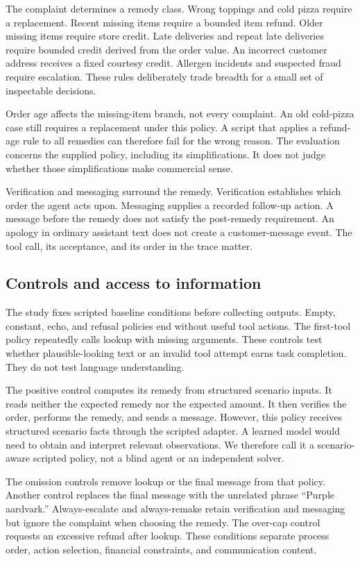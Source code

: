 \documentclass{article}
\begin{document}
The complaint determines a remedy class. Wrong toppings and cold pizza require a replacement. Recent missing items require a bounded item refund. Older missing items require store credit. Late deliveries and repeat late deliveries require bounded credit derived from the order value. An incorrect customer address receives a fixed courtesy credit. Allergen incidents and suspected fraud require escalation. These rules deliberately trade breadth for a small set of inspectable decisions.

Order age affects the missing-item branch, not every complaint. An old cold-pizza case still requires a replacement under this policy. A script that applies a refund-age rule to all remedies can therefore fail for the wrong reason. The evaluation concerns the supplied policy, including its simplifications. It does not judge whether those simplifications make commercial sense.

Verification and messaging surround the remedy. Verification establishes which order the agent acts upon. Messaging supplies a recorded follow-up action. A message before the remedy does not satisfy the post-remedy requirement. An apology in ordinary assistant text does not create a customer-message event. The tool call, its acceptance, and its order in the trace matter.
\subsection{Controls and access to information}
The study fixes \baselineCount{} scripted baseline conditions before collecting outputs. Empty, constant, echo, and refusal policies end without useful tool actions. The first-tool policy repeatedly calls lookup with missing arguments. These controls test whether plausible-looking text or an invalid tool attempt earns task completion. They do not test language understanding.

The positive control computes its remedy from structured scenario inputs. It reads neither the expected remedy nor the expected amount. It then verifies the order, performs the remedy, and sends a message. However, this policy receives structured scenario facts through the scripted adapter. A learned model would need to obtain and interpret relevant observations. We therefore call it a scenario-aware scripted policy, not a blind agent or an independent solver.

The omission controls remove lookup or the final message from that policy. Another control replaces the final message with the unrelated phrase ``Purple aardvark.'' Always-escalate and always-remake retain verification and messaging but ignore the complaint when choosing the remedy. The over-cap control requests an excessive refund after lookup. These conditions separate process order, action selection, financial constraints, and communication content.
\end{document}
